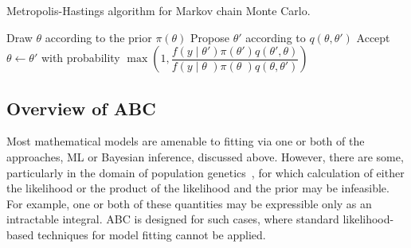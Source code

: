 \begin{algorithm}
  \caption{Metropolis-Hastings algorithm for Markov chain Monte Carlo.}
  \begin{algorithmic}
    \State Draw $\theta$ according to the prior $\pi(\theta)$
    \Loop
      \State Propose $\theta'$ according to $q(\theta, \theta')$
      \State Accept $\theta \gets \theta'$ with probability
      $\max \left( 1, 
       \dfrac{f(y \mid \theta') \pi(\theta') q(\theta', \theta)}
             {f(y \mid \theta\phantom{'}) \pi(\theta\phantom{'}) q(\theta, \theta')}
       \right)$
    \EndLoop
  \end{algorithmic}
  \label{alg:mh}
\end{algorithm}

\subsection{Overview of ABC}
\label{subsec:abcoverview}

Most mathematical models are amenable to fitting via one or both of the
approaches, \gls{ML} or Bayesian inference, discussed above. However, there are
some, particularly in the domain of population
genetics~\autocite{beaumont2002approximate, beaumont2010approximate}, for which
calculation of either the likelihood or the product of the likelihood and the
prior may be infeasible. For example, one or both of these quantities may be
expressible only as an intractable integral. \Gls{ABC} is designed for such
cases, where standard likelihood-based techniques for model fitting cannot be
applied. 

